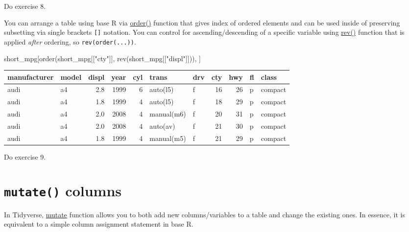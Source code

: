 \documentclass[
]{book}
\newenvironment{Shaded}{\begin{snugshade}}{\end{snugshade}}
\newcommand{\FunctionTok}[1]{\textcolor[rgb]{0.00,0.00,0.00}{#1}}
\newcommand{\NormalTok}[1]{#1}
\newcommand{\StringTok}[1]{\textcolor[rgb]{0.31,0.60,0.02}{#1}}
\begin{document}
Do exercise 8.

You can arrange a table using base R via \href{https://stat.ethz.ch/R-manual/R-devel/library/base/html/order.html}{order()} function that gives index of ordered elements and can be used inside of preserving subsetting via single brackets \texttt{{[}{]}} notation. You can control for ascending/descending of a specific variable using \href{https://stat.ethz.ch/R-manual/R-devel/library/base/html/rev.html}{rev()} function that is applied \emph{after} ordering, so \texttt{rev(order(...))}.

\begin{Shaded}
\begin{Highlighting}[]
\NormalTok{short\_mpg[}\FunctionTok{order}\NormalTok{(short\_mpg[[}\StringTok{"cty"}\NormalTok{]], }\FunctionTok{rev}\NormalTok{(short\_mpg[[}\StringTok{"displ"}\NormalTok{]])), ]}
\end{Highlighting}
\end{Shaded}

\begin{tabular}{l|l|r|r|r|l|l|r|r|l|l}
\hline
manufacturer & model & displ & year & cyl & trans & drv & cty & hwy & fl & class\\
\hline
audi & a4 & 2.8 & 1999 & 6 & auto(l5) & f & 16 & 26 & p & compact\\
\hline
audi & a4 & 1.8 & 1999 & 4 & auto(l5) & f & 18 & 29 & p & compact\\
\hline
audi & a4 & 2.0 & 2008 & 4 & manual(m6) & f & 20 & 31 & p & compact\\
\hline
audi & a4 & 2.0 & 2008 & 4 & auto(av) & f & 21 & 30 & p & compact\\
\hline
audi & a4 & 1.8 & 1999 & 4 & manual(m5) & f & 21 & 29 & p & compact\\
\hline
\end{tabular}

Do exercise 9.

\hypertarget{mutate}{%
\section{\texorpdfstring{\texttt{mutate()} columns}{mutate() columns}}\label{mutate}}

In Tidyverse, \href{https://dplyr.tidyverse.org/reference/mutate.html}{mutate} function allows you to both add new columns/variables to a table and change the existing ones. In essence, it is equivalent to a simple column assignment statement in base R.
\end{document}
